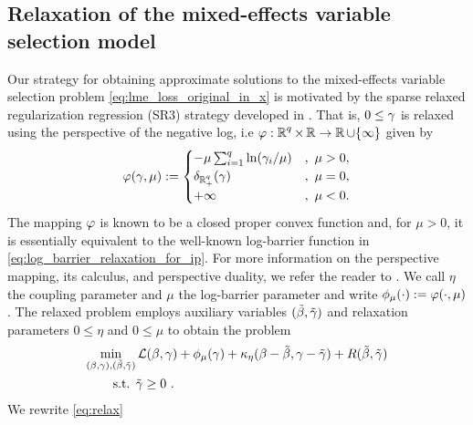 \subsection{Relaxation of the mixed-effects variable selection model}
\label{sec:relax}

Our strategy for obtaining approximate solutions to the
mixed-effects variable selection problem \eqref{eq:lme_loss_original_in_x} is
motivated by the sparse relaxed regularization regression (SR3) strategy
developed in \cite{Zheng2019SR3}. That is, $0\le\gamma$ is relaxed
using the perspective of the negative log, i.e %
$\varphi:\operatorname{\mathbb{R}}^q\times\operatorname{\mathbb{R}}\rightarrow \operatorname{\mathbb{R}}\cup\{\infty\}$ given by
\[
\varphi(\gamma,\mu):=
\begin{cases}
-\mu\sum_{i=1}^q\ln (\gamma_i/\mu)&,\ \mu>0,\\
\delta_{\operatorname{\mathbb{R}}^q_+}(\gamma)&,\ \mu=0,\\
+\infty&,\ \mu<0.
\end{cases}
\]
The mapping $\varphi$ is known to be a closed proper convex function and, 
for $\mu>0$, it is
essentially equivalent to the well-known log-barrier function in \eqref{eq:log_barrier_relaxation_for_ip}. 
For more information on the perspective mapping, its calculus,
and perspective duality, we refer the reader to \cite{ABDFM18,ABF13}.
We call $\eta$ the coupling parameter and $\mu$ the log-barrier parameter
and write $\phi_\mu(\cdot):=\varphi(\cdot,\mu)$.
The relaxed problem employs 
auxiliary variables $(\tilde\beta,{\tilde{\gamma}})$ 
and relaxation parameters $0\le\eta$ and $0\le \mu$
to obtain the problem 
\begin{equation}\label{eq:relax} 
\begin{aligned}%
\min_{\bg, \tbg} & \LL(\beta, \gamma) 
	+\phi_\mu(\gam)+\kappa_\eta(\beta-\tbeta,\gam-\tgam)
+ R(\tbeta, \tgamma) 
\\
\text{s.t. } & \tgamma \geq 0\ .
\end{aligned}
\end{equation}
We rewrite \eqref{eq:relax} %

